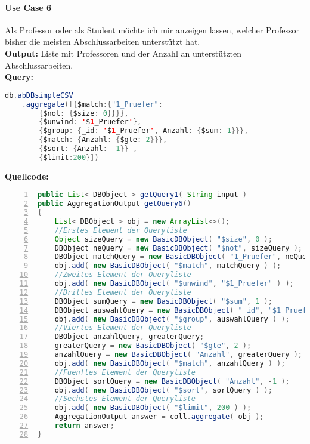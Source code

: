 \paragraph{Use Case 6} Als Professor oder als Student möchte ich mir anzeigen lassen, welcher Professor bisher die meisten Abschlussarbeiten unterstützt hat. \\
\textbf{Output:} Liste mit Professoren und der Anzahl an unterstützten Abschlussarbeiten. \\
\textbf{Query:}

\begin{lstlisting}[caption={Query zu Use Case 6},language=java,captionpos=t,numbers=none, numberstyle=\tiny,basicstyle=\scriptsize,breaklines=true]
db.abDBsimpleCSV
	.aggregate([{$match:{"1_Pruefer": 
		{$not: {$size: 0}}}},
		{$unwind: '$1_Pruefer'}, 
		{$group: {_id: '$1_Pruefer', Anzahl: {$sum: 1}}}, 
		{$match: {Anzahl: {$gte: 2}}},
		{$sort: {Anzahl: -1}} ,
		{$limit:200}])
\end{lstlisting}\label{lst:query6}

\textbf{Quellcode:}

\begin{lstlisting}[caption={Quellcode zu Use Case 6},language=java,captionpos=t,numbers=left, numberstyle=\tiny,basicstyle=\scriptsize,breaklines=true]
public List< DBObject > getQuery1( String input )
public AggregationOutput getQuery6()
{
    List< DBObject > obj = new ArrayList<>();
    //Erstes Element der Queryliste
    Object sizeQuery = new BasicDBObject( "$size", 0 );
    DBObject neQuery = new BasicDBObject( "$not", sizeQuery );
    DBObject matchQuery = new BasicDBObject( "1_Pruefer", neQuery );
    obj.add( new BasicDBObject( "$match", matchQuery ) );
    //Zweites Element der Queryliste
    obj.add( new BasicDBObject( "$unwind", "$1_Pruefer" ) );
    //Drittes Element der Queryliste
    DBObject sumQuery = new BasicDBObject( "$sum", 1 );
    DBObject auswahlQuery = new BasicDBObject( "_id", "$1_Pruefer" ).append( "Anzahl", sumQuery );
    obj.add( new BasicDBObject( "$group", auswahlQuery ) );
    //Viertes Element der Queryliste
    DBObject anzahlQuery, greaterQuery;
    greaterQuery = new BasicDBObject( "$gte", 2 );
    anzahlQuery = new BasicDBObject( "Anzahl", greaterQuery );
    obj.add( new BasicDBObject( "$match", anzahlQuery ) );
    //Fuenftes Element der Queryliste
    DBObject sortQuery = new BasicDBObject( "Anzahl", -1 );
    obj.add( new BasicDBObject( "$sort", sortQuery ) );
    //Sechstes Element der Queryliste
    obj.add( new BasicDBObject( "$limit", 200 ) );
    AggregationOutput answer = coll.aggregate( obj );
    return answer;
}
\end{lstlisting}\label{lst:query6code}

